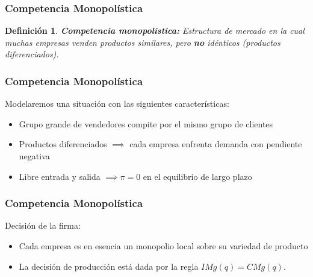 \documentclass[dvipsnames,table,leqno]{beamer}
\newtheorem{mydef}{Definición}
\newcommand{\rp}[1]{\left(#1\right)}
\begin{document}
		\begin{frame}
			\frametitle{Competencia Monopolística}
			\begin{mydef}
				\textbf{Competencia monopolística:} Estructura de mercado en la cual muchas empresas venden productos similares, pero \textbf{no} idénticos (productos diferenciados).
			\end{mydef}
		\end{frame}		
	
		\begin{frame}
			\frametitle{Competencia Monopolística}
			Modelaremos una situación con las siguientes características:
			\begin{itemize}
				\item Grupo grande de vendedores compite por el mismo grupo de clientes
				\item Productos diferenciados $\implies$ cada empresa enfrenta demanda con pendiente negativa
				\item Libre entrada y salida $\implies\pi=0$ en el equilibrio de largo plazo
			\end{itemize}
		\end{frame}				


		\begin{frame}
			\frametitle{Competencia Monopolística}
			Decisión de la firma:
			\begin{itemize}
				\item Cada empresa es en esencia un monopolio local sobre su variedad de producto
				\item La decisión de producción está dada por la regla $IMg\rp{q}=CMg\rp{q}$.
			\end{itemize}
		\end{frame}	
\end{document}
